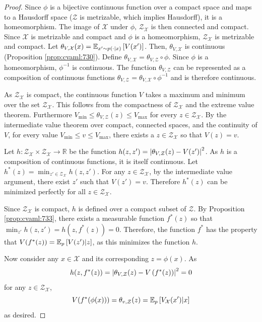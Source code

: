 \begin{proof}
    
Since $\phi$ is a bijective continuous function over a compact space and maps to a Hausdorff space ($\mathcal{Z}$ is metrizable, which implies Hausdorff), it is a homeomorphism.
The image of $\mathcal{X}$ under $\phi$, $\mathcal{Z}_\mathcal{X}$ is then connected and compact.
Since $\mathcal{X}$ is metrizable and compact and $\phi$ is a homeomorphism, $\mathcal{Z}_\mathcal{X}$ is metrizable and compact.
Let $\theta_{V,\mathcal{X}}(x) = \mathbb{E}_{x' \sim p(\cdot|x)}\left[  V(x') \right]$.
Then, $\theta_{V,\mathcal{X}}$ is continuous (Proposition \autoref{prop:cvaml:730}).
Define $\theta_{V, \mathcal{X}} = \theta_{V, \mathcal{Z}} \circ \phi$.
Since $\phi$ is a homeomorphism, $\phi^{-1}$ is continuous.
The function $\theta_{V, \mathcal{Z}}$ can be represented as a composition of continuous functions $\theta_{V, \mathcal{Z}} = \theta_{V, \mathcal{X}} \circ \phi^{-1}$ and is therefore continuous.

As $\mathcal{Z}_\mathcal{X}$ is compact, the continuous function $V$ takes a maximum and minimum over the set $\mathcal{Z}_\mathcal{X}$. 
This follows from the compactness of $\mathcal{Z}_\mathcal{X}$ and the extreme value theorem. 
Furthermore $V_{\min} \leq \theta_{V,\mathcal{Z}}(z) \leq V_{\max}$ for every $z \in \mathcal{Z}_\mathcal{X}$.
By the intermediate value theorem over compact, connected spaces, and the continuity of $V$, for every value $V_{\min} \leq v \leq V_{\max}$, there exists a $z \in \mathcal{Z}_\mathcal{X}$ so that $V(z) = v$.


Let $h: \mathcal{Z}_\mathcal{X} \times \mathcal{Z}_\mathcal{X} \rightarrow \mathbb{R}$ be the function $h(z,z') = \left|\theta_{V,\mathcal{Z}}(z) - V(z')\right|^2$.
As $h$ is a composition of continuous functions, it is itself continuous.
Let $h^*(z) = \min_{z' \in \mathcal{Z}_\mathcal{X}} h(z,z')$.
For any $z \in \mathcal{Z}_\mathcal{X}$, by the intermediate value argument, there exist $z'$ such that $V(z') = v$. 
Therefore $h^*(z)$ can be minimized perfectly for all $z \in \mathcal{Z}_\mathcal{X}$.

Since $\mathcal{Z}_\mathcal{X}$ is compact, $h$ is defined over a compact subset of $\mathcal{Z}$.
By Proposition \autoref{prop:cvaml:733}, there exists a measurable function $f^*(z)$ so that $\min_{z'} h(z, z') = h(z, f^*(z)) = 0$.
Therefore, the function $f^*$ has the property that $V(f^*(z)) = \mathbb{E}_{p}\left[  V(z')|z \right]$, as this minimizes the function $h$.

Now consider any $x\in\mathcal{X}$ and its corresponding $z=\phi(x)$.
As $$h(z, f^*(z))=\left|\theta_{V,\mathcal{Z}}(z) - V\left( f^*(z) \right)\right|^2  = 0$$ for any $z \in \mathcal{Z}_\mathcal{X}$, $$V(f^*(\phi(x))) = \theta_{v,\mathcal{Z}}(z) = \mathbb{E}_{p}\left[  V_\mathcal{X}(x')|x \right]$$ as desired.

\end{proof}

